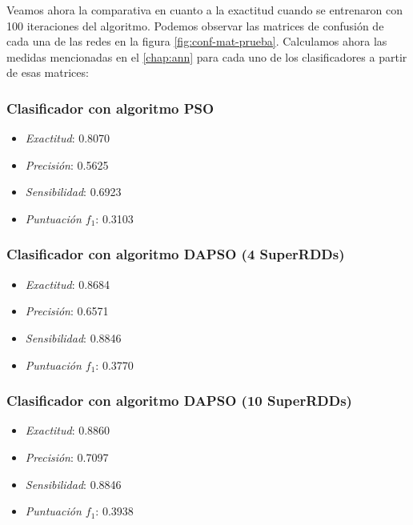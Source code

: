 \vspace{10pt}
Veamos ahora la comparativa en cuanto a la exactitud cuando se entrenaron con 100 iteraciones del algoritmo. Podemos 
observar las matrices de confusión de cada una de las redes en la figura \ref{fig:conf-mat-prueba}. Calculamos ahora las 
medidas mencionadas en el \autoref{chap:ann} para cada uno de los clasificadores a partir de esas matrices:

\begin{minipage}[c]{.33\textwidth}
\subsubsection*{Clasificador con algoritmo PSO}
\begin{itemize}
    \item \textit{Exactitud}: 0.8070
    \item \textit{Precisión}: 0.5625
    \item \textit{Sensibilidad}: 0.6923
    \item \textit{Puntuación $f_1$}: 0.3103
\end{itemize}
\end{minipage}%
\begin{minipage}[c]{.33\textwidth}
\subsubsection*{Clasificador con algoritmo DAPSO (4 SuperRDDs)}
\begin{itemize}
    \item \textit{Exactitud}: 0.8684
    \item \textit{Precisión}: 0.6571
    \item \textit{Sensibilidad}: 0.8846
    \item \textit{Puntuación $f_1$}: 0.3770
\end{itemize}
\end{minipage}%
\begin{minipage}[c]{.33\textwidth}
\subsubsection*{Clasificador con algoritmo DAPSO (10 SuperRDDs)}
\begin{itemize}
    \item \textit{Exactitud}: 0.8860
    \item \textit{Precisión}: 0.7097
    \item \textit{Sensibilidad}: 0.8846
    \item \textit{Puntuación $f_1$}: 0.3938
\end{itemize}
\end{minipage}%

